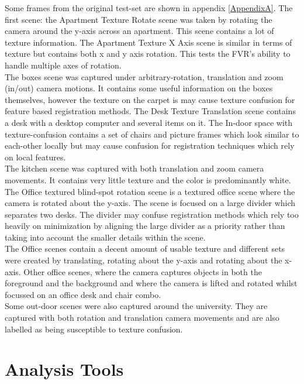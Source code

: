 Some frames from the original test-set are shown in appendix \ref{AppendixA}. The first scene: the Apartment Texture Rotate scene was taken by rotating the camera around the y-axis across an apartment. This scene contains a lot of texture information. The Apartment Texture X Axis scene is similar in terms of texture but contains both x and y axis rotation. This tests the FVR's ability to handle multiple axes of rotation. \\

The boxes scene was captured under arbitrary-rotation, translation and zoom (in/out) camera motions. It contains some useful information on the boxes themselves, however the texture on the carpet is may cause texture confusion for feature based registration methods. The Desk Texture Translation scene contains a desk with a desktop computer and several items on it. The In-door space with texture-confusion contains a set of chairs and picture frames which look similar to each-other locally but may cause confusion for registration techniques which rely on local features.  \\

The kitchen scene was captured with both translation and zoom camera movements. It contains very little texture and the color is predominantly white. The Office textured blind-spot rotation scene is a textured office scene where the camera is rotated about the y-axis. The scene is focused on a large divider which separates two desks. The divider may confuse registration methods which rely too heavily on minimization by aligning the large divider as a priority rather than taking into account the smaller details within the scene. \\

The Office scenes contain a decent amount of usable texture and different sets were created by translating, rotating about the y-axis and rotating about the x-axis. Other office scenes, where the camera captures objects in both the foreground and the background and where the camera is lifted and rotated whilst focussed on an office desk and chair combo. \\

Some out-door scenes were also captured around the university. They are captured with both rotation and translation camera movements and are also labelled as being susceptible to texture confusion.

\section{Analysis Tools}
\label{ToolsSection}

